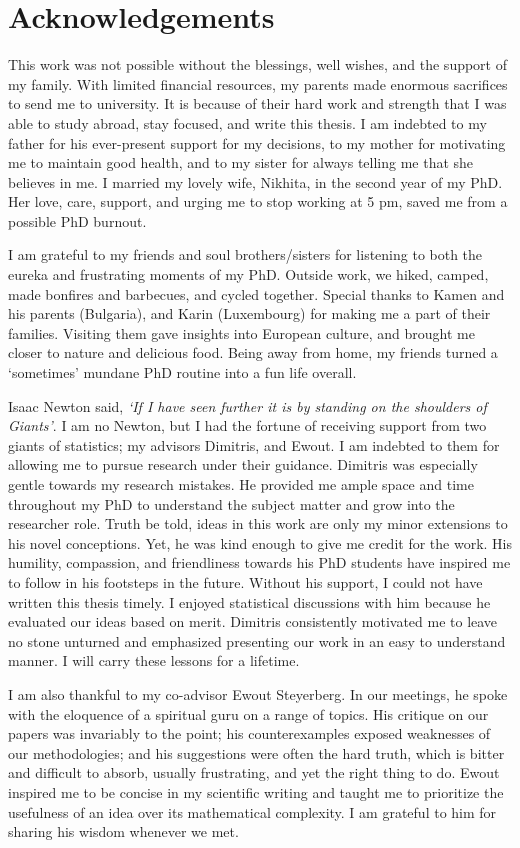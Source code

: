 \section{Acknowledgements}
This work was not possible without the blessings, well wishes, and the support of my family. With limited financial resources, my parents made enormous sacrifices to send me to university. It is because of their hard work and strength that I was able to study abroad, stay focused, and write this thesis. I am indebted to my father for his ever-present support for my decisions, to my mother for motivating me to maintain good health, and to my sister for always telling me that she believes in me. I married my lovely wife, Nikhita, in the second year of my PhD. Her love, care, support, and urging me to stop working at 5 pm, saved me from a possible PhD burnout. 

I am grateful to my friends and soul brothers/sisters for listening to both the eureka and frustrating moments of my PhD. Outside work, we hiked, camped, made bonfires and barbecues, and cycled together. Special thanks to Kamen and his parents (Bulgaria), and Karin (Luxembourg) for making me a part of their families. Visiting them gave insights into European culture, and brought me closer to nature and delicious food. Being away from home, my friends turned a `sometimes' mundane PhD routine into a fun life overall.

Isaac Newton said, \emph{`If I have seen further it is by standing on the shoulders of Giants'}. I am no Newton, but I had the fortune of receiving support from two giants of statistics; my advisors Dimitris, and Ewout. I am indebted to them for allowing me to pursue research under their guidance. Dimitris was especially gentle towards my research mistakes. He provided me ample space and time throughout my PhD to understand the subject matter and grow into the researcher role. Truth be told, ideas in this work are only my minor extensions to his novel conceptions. Yet, he was kind enough to give me credit for the work. His humility, compassion, and friendliness towards his PhD students have inspired me to follow in his footsteps in the future. Without his support, I could not have written this thesis timely. I enjoyed statistical discussions with him because he evaluated our ideas based on merit. Dimitris consistently motivated me to leave no stone unturned and emphasized presenting our work in an easy to understand manner. I will carry these lessons for a lifetime.

I am also thankful to my co-advisor Ewout Steyerberg. In our meetings, he spoke with the eloquence of a spiritual guru on a range of topics. His critique on our papers was invariably to the point; his counterexamples exposed weaknesses of our methodologies; and his suggestions were often the hard truth, which is bitter and difficult to absorb, usually frustrating, and yet the right thing to do. Ewout inspired me to be concise in my scientific writing and taught me to prioritize the usefulness of an idea over its mathematical complexity. I am grateful to him for sharing his wisdom whenever we met. 

